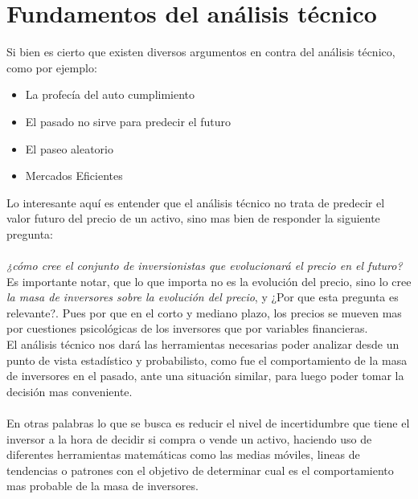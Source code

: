 \section{Fundamentos del análisis técnico}

Si bien es cierto que existen diversos argumentos en contra del análisis técnico, como por ejemplo:

\begin{itemize}
	\item La profecía del auto cumplimiento
	\item El pasado no sirve para predecir el futuro
	\item El paseo aleatorio
	\item Mercados Eficientes
\end{itemize}

Lo interesante aquí es entender que el análisis técnico no trata de predecir el valor futuro del precio de un activo, sino mas bien de responder la siguiente pregunta:\\\\

\emph{¿cómo cree el conjunto de inversionistas que evolucionará el precio en el futuro? }
\\

Es importante notar, que lo que importa no es la evolución del precio, sino lo cree \emph{la masa de inversores sobre la evolución del precio}, y ¿Por que esta pregunta es relevante?. Pues por que en el corto y mediano plazo, los precios se mueven mas por cuestiones psicológicas de los inversores que por variables financieras.\\

El análisis técnico nos dará las herramientas necesarias poder analizar desde un punto de vista estadístico y probabilisto, como fue el comportamiento de la masa de inversores en el pasado, ante una situación similar, para luego poder tomar la decisión mas conveniente.
\\\\
En otras palabras lo que se busca es reducir el nivel de incertidumbre que tiene el inversor a la hora de decidir si compra o vende un activo, haciendo uso de diferentes herramientas matemáticas como las medias móviles, lineas de tendencias o patrones con el objetivo de determinar cual es el comportamiento mas probable de la masa de inversores.


